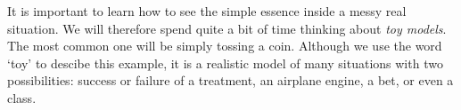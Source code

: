 It is important to learn how to see the simple essence
 inside a messy real situation. We will therefore spend quite a bit of time
thinking about \emph{toy models}.
The most common one will be simply tossing a coin. Although we use the 
word `toy' to descibe this example, it is a realistic model of many situations with 
two possibilities: success or failure of a treatment, an airplane engine,  a bet, or even a class.




